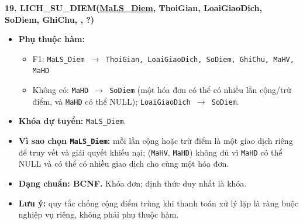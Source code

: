 \documentclass[11pt, a4paper]{article}
\newcommand{\pk}[1]{\bgroup\ULdepth=1.8pt\uline{#1}\egroup}
\newcommand{\fk}[1]{\bgroup\ULdepth=1.8pt\dashuline{#1}\egroup}
\begin{document}
\textbf{19. LICH\_SU\_DIEM(\pk{MaLS\_Diem}, ThoiGian, LoaiGiaoDich, SoDiem, GhiChu, \fk{MaHV}, \fk{MaHD}?)}
\begin{itemize}
    \item \textbf{Phụ thuộc hàm:}
    \begin{itemize}
        \item F1: \texttt{MaLS\_Diem $\rightarrow$ ThoiGian, LoaiGiaoDich, SoDiem, GhiChu, MaHV, MaHD}
        \item Không có: \texttt{MaHD $\rightarrow$ SoDiem} (một hóa đơn có thể có nhiều lần cộng/trừ điểm, và \texttt{MaHD} có thể NULL); \texttt{LoaiGiaoDich $\rightarrow$ SoDiem}.
    \end{itemize}
    \item \textbf{Khóa dự tuyển:} \texttt{MaLS\_Diem}.
    \item \textbf{Vì sao chọn \texttt{MaLS\_Diem}:} mỗi lần cộng hoặc trừ điểm là một giao dịch riêng để truy vết và giải quyết khiếu nại; (\texttt{MaHV}, \texttt{MaHD}) không đủ vì \texttt{MaHD} có thể NULL và có thể có nhiều giao dịch cho cùng một hóa đơn.
    \item \textbf{Dạng chuẩn: BCNF.} Khóa đơn; định thức duy nhất là khóa.
    \item \textbf{Lưu ý:} quy tắc chống cộng điểm trùng khi thanh toán xử lý lặp là ràng buộc nghiệp vụ riêng, không phải phụ thuộc hàm.
\end{itemize}
\end{document}
